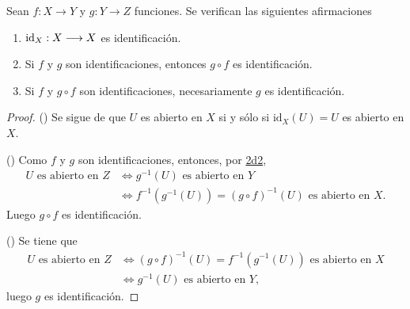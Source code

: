 

\begin{proposition}
Sean $f : X \longrightarrow Y$ y $g : Y \longrightarrow Z$ funciones. Se verifican las siguientes afirmaciones
\begin{enumerate}[label=\textnormal{(\roman*)}]
\item $\textnormal{id}_X : X \longrightarrow X$ es identificación.
\item Si $f$ y $g$ son identificaciones, entonces $g \circ f$ es identificación.
\item Si $f$ y $g \circ f$ son identificaciones, necesariamente $g$ es identificación.
\end{enumerate}
\end{proposition}

\begin{proof}
({\scshape{}}) Se sigue de que $U$ es abierto en $X$ si y sólo si $\text{id}_X(U) = U$ es abierto en $X$.
\bigskip

({\scshape{}}) Como $f$ y $g$ son identificaciones, entonces, por \hyperref[card:2d2]{\textsf{2d2}},
\begin{align*}
    U \text{ es abierto en } Z & \iff g^{-1}(U) \text{ es abierto en } Y \\
                               & \iff f^{-1}(g^{-1}(U)) = (g \circ f)^{-1}(U) \text{ es abierto en } X.
\end{align*}
Luego $g \circ f$ es identificación.
\bigskip

({\scshape{}}) Se tiene que
\begin{align*}
    U \text{ es abierto en } Z & \iff (g \circ f)^{-1}(U) = f^{-1}(g^{-1}(U)) \text{ es abierto en } X \\
                               & \iff g^{-1}(U) \text{ es abierto en } Y,
\end{align*}
luego $g$ es identificación.
\end{proof}
